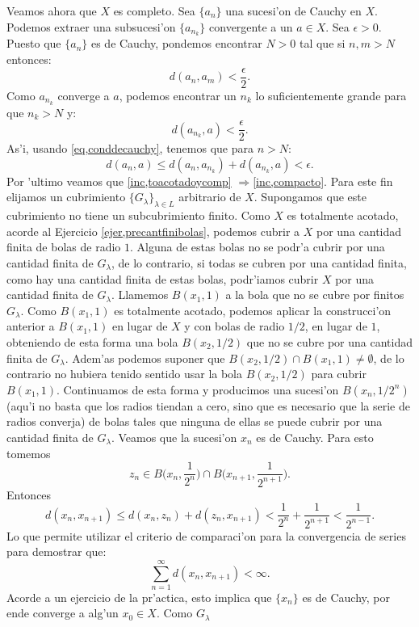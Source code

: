 \begin{demo}
Veamos ahora que $X$ es completo. Sea $\{a_n\}$ una sucesi'on de
Cauchy en $X$. Podemos extraer una subsucesi'on $\{a_{n_k}\}$
convergente a un $a\in X$. Sea $\epsilon>0$. Puesto que $\{a_n\}$
es de Cauchy, pondemos encontrar $N>0$ tal que si $n,m>N$ entonces:
\begin{equation}\label{eq,conddecauchy}
	d(a_n,a_m)<\frac{\epsilon}{2}.
\end{equation}
Como $a_{n_k}$ converge a $a$, podemos encontrar un $n_k$ lo
suficientemente
grande para que $n_k>N$ y:
\[
	d(a_{n_k},a)<\frac{\epsilon}{2}.
\]
As'i, usando \eqref{eq,conddecauchy},  tenemos que para $n>N$:
\[
	d(a_n,a)\leq d(a_n,a_{n_k})+d(a_{n_k},a)<\epsilon.
\]
Por 'ultimo veamos que \ref{inc,toacotadoycomp}
$\Rightarrow$\ref{inc,compacto}. Para este fin elijamos un
cubrimiento $\{G_{\lambda}\}_{\lambda\in L}$ arbitrario de $X$.
Supongamos que este cubrimiento no tiene un subcubrimiento finito.
Como $X$ es totalmente acotado, acorde al Ejercicio
\ref{ejer,precantfinibolas}, podemos cubrir a $X$ por una cantidad
finita de bolas de radio $1$. Alguna de estas bolas no se podr'a
cubrir por una cantidad finita de $G_{\lambda}$, de lo contrario,
si todas se cubren por una cantidad finita, como hay una cantidad
finita de estas bolas, podr'iamos cubrir $X$ por una cantidad
finita de $G_{\lambda}$. Llamemos $B(x_1,1)$ a la bola que no se
cubre por finitos $G_{\lambda}$. Como $B(x_1,1)$ es totalmente
acotado, podemos aplicar la construcci'on anterior a $B(x_1,1)$ en
lugar de $X$ y con bolas de radio $1/2$, en lugar de $1$,
obteniendo de esta forma una bola $B(x_2,1/2)$ que no se cubre por
una cantidad finita de $G_{\lambda}$. Adem'as podemos suponer que
$B(x_2,1/2)\cap B(x_1,1)\neq \emptyset$, de lo contrario no
hubiera tenido sentido usar la bola $B(x_2,1/2)$ para cubrir
$B(x_1,1)$. Continuamos de esta forma y producimos una sucesi'on
$B(x_n,1/2^n)$ (aqu'i no basta que los radios tiendan a cero, sino
que es necesario que la serie de radios converja) de bolas tales
que ninguna de ellas se puede cubrir por una cantidad finita de
$G_{\lambda}$. Veamos que la sucesi'on $x_n$ es de Cauchy.   Para
esto tomemos
\[
	z_n\in B\Big(x_n,\frac{1}{2^n}\Big)\cap B\Big(x_{n+1}
	,\frac{1}{2^{n+1}}\Big).
\]
Entonces
\[
	d(x_n,x_{n+1})\leq d(x_n,z_n)+d(z_n,x_{n+1})<
	\frac{1}{2^n}+\frac{1}{2^{n+1}}<\frac{1}{2^{n-1}}.
\]
Lo que permite utilizar el criterio de comparaci'on para
la convergencia de series para demostrar que:
\[
	\sum\limits_{n=1}^{\infty}d(x_n,x_{n+1})<\infty.
\]
Acorde a un ejercicio de la pr'actica, esto implica que $\{x_n\}$ es
de Cauchy, por ende converge a alg'un $x_0\in X$. Como $G_{\lambda}$

\end{demo}
